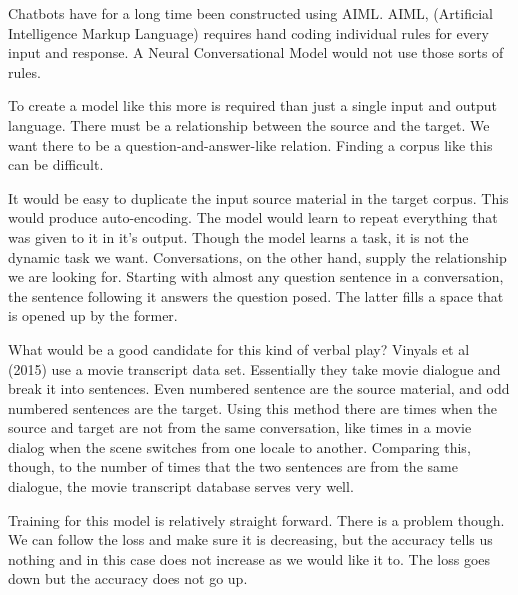 Chatbots have for a long time been constructed using \ac{AIML}. AIML, (Artificial Intelligence Markup Language) requires hand coding individual rules for every input and response. A Neural Conversational Model would not use those sorts of rules.

To create a model like this more is required than just a single input and output language. There must be a relationship between the source and the target. We want there to be a question-and-answer-like relation. Finding a corpus like this can be difficult.

It would be easy to duplicate the input source material in the target corpus. This would produce auto-encoding. The model would learn to repeat everything that was given to it in it's output. Though the model learns a task, it is not the dynamic task we want. Conversations, on the other hand, supply the relationship we are looking for. Starting with almost any question sentence in a conversation, the sentence following it answers the question posed. The latter fills a space that is opened up by the former. 

What would be a good candidate for this kind of verbal play? Vinyals et al (2015)\cite{DBLP:journals/corr/VinyalsL15} use a movie transcript data set. Essentially they take movie dialogue and break it into sentences. Even numbered sentence are the source material, and odd numbered sentences are the target. Using this method there are times when the source and target are not from the same conversation, like times in a movie dialog when the scene switches from one locale to another. Comparing this, though, to the number of times that the two sentences are from the same dialogue, the movie transcript database serves very well.

Training for this model is relatively straight forward. There is a problem though. We can follow the loss and make sure it is decreasing, but the accuracy tells us nothing and in this case does not increase as we would like it to. The loss goes down but the accuracy does not go up.

